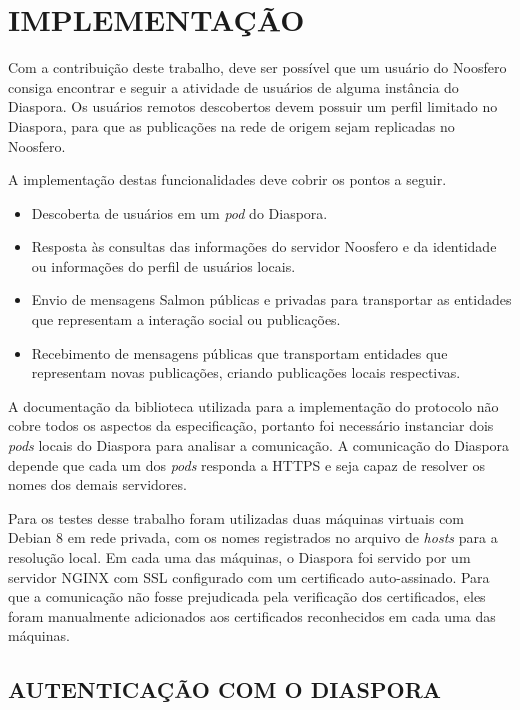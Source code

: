 \chapter{IMPLEMENTAÇÃO}
\label{chapter:4}

Com a contribuição deste trabalho, deve ser possível que um usuário do Noosfero
consiga encontrar e seguir a atividade de usuários de alguma instância do Diaspora.
Os usuários remotos descobertos devem possuir um perfil limitado no Diaspora, para
que as publicações na rede de origem sejam replicadas no Noosfero.

A implementação destas funcionalidades deve cobrir os pontos a seguir.

\begin{itemize}
  \item{Descoberta de usuários em um \textit{pod} do Diaspora.}
  \item{Resposta às consultas das informações do servidor Noosfero e da identidade
        ou informações do perfil de usuários locais.}
  \item{Envio de mensagens Salmon públicas e privadas para transportar as entidades
        que representam a interação social ou publicações.}
  \item{Recebimento de mensagens públicas que transportam entidades que representam
        novas publicações, criando publicações locais respectivas.}
\end{itemize}

A documentação da biblioteca utilizada para a implementação do protocolo não cobre
todos os aspectos da especificação, portanto foi necessário instanciar dois
\textit{pods} locais do Diaspora para analisar a comunicação. A comunicação do
Diaspora depende que cada um dos \textit{pods} responda a HTTPS e seja capaz de
resolver os nomes dos demais servidores.

Para os testes desse trabalho foram utilizadas duas máquinas virtuais com Debian 8
em rede privada, com os nomes registrados no arquivo de \textit{hosts} para a
resolução local. Em cada uma das máquinas, o Diaspora foi servido por um servidor
NGINX com SSL configurado com um certificado auto-assinado. Para que a comunicação
não fosse prejudicada pela verificação dos certificados, eles foram manualmente
adicionados aos certificados reconhecidos em cada uma das máquinas.

\section{AUTENTICAÇÃO COM O DIASPORA}

